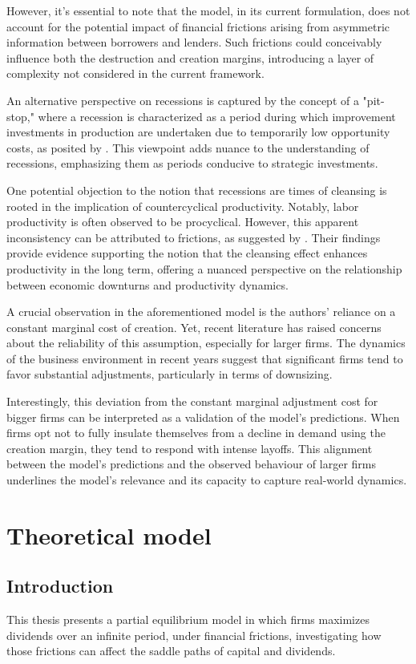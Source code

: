 \documentclass[12pt]{article}
\begin{document}
However, it's essential to note that the model, in its current formulation, does not account for the potential impact of
financial frictions arising from asymmetric information between borrowers and lenders. Such frictions could conceivably
influence both the destruction and creation margins, introducing a layer of complexity not considered in the current
framework. 

An alternative perspective on recessions is captured by the concept of a "pit-stop," where a recession is characterized
as a period during which improvement investments in production are undertaken due to temporarily low opportunity costs,
as posited by \cite{DAvHalt90}. This viewpoint adds nuance to the understanding of recessions, emphasizing them as
periods conducive to strategic investments. 

One potential objection to the notion that recessions are times of cleansing is rooted in the implication of
countercyclical productivity. Notably, labor productivity is often observed to be procyclical. However, this apparent
inconsistency can be attributed to frictions, as suggested by \cite{GaHam92}. Their findings provide evidence supporting
the notion that the cleansing effect enhances productivity in the long term, offering a nuanced perspective on the
relationship between economic downturns and productivity dynamics. 
\par
A crucial observation in the aforementioned model is the authors' reliance on a constant marginal cost of creation. Yet,
recent literature has raised concerns about the reliability of this assumption, especially for larger firms. The
dynamics of the business environment in recent years suggest that significant firms tend to favor substantial
adjustments, particularly in terms of downsizing. 
\par
Interestingly, this deviation from the constant marginal adjustment cost for bigger firms can be interpreted as a
validation of the model's predictions. When firms opt not to fully insulate themselves from a decline in demand using
the creation margin, they tend to respond with intense layoffs. This alignment between the model's predictions and the
observed behaviour of larger firms underlines the model's relevance and its capacity to capture real-world dynamics. 

\section{Theoretical model}
\subsection{Introduction}
This thesis presents a partial equilibrium model in which firms maximizes dividends over an infinite period, under financial frictions,
investigating how those frictions can affect the saddle paths of capital and dividends.
\end{document}
